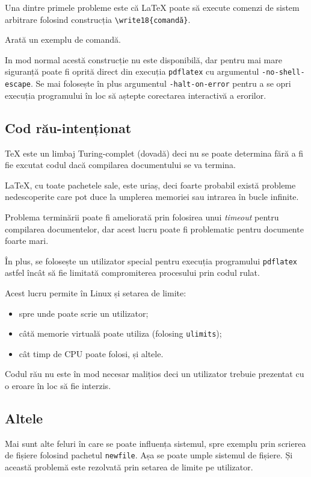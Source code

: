 \documentclass[a4wide,12pt]{report}
\newcommand{\eng}[1]{\emph{#1}} %
\newcommand{\cod}[1]{\texttt{#1}}
\newcommand{\idee}[1]{{\color{red} #1}}
\newcommand{\poate}[1]{#1}
\begin{document}
Una dintre primele probleme este că \LaTeX{} poate să execute comenzi de sistem
arbitrare folosind construcția \cod{\textbackslash write18\{comandă\}}.

\idee{Arată un exemplu de comandă.}

In mod normal acestă construcție nu este disponibilă, dar pentru mai mare
siguranță poate fi oprită direct din execuția \cod{pdflatex} cu argumentul
\cod{-no-shell-escape}. \poate{Se mai folosește în plus argumentul
\cod{-halt-on-error} pentru a se opri execuția programului în loc să aștepte
corectarea interactivă a erorilor.}

\subsection{Cod rău-intenționat}

\TeX{} este un limbaj Turing-complet \idee{(dovadă)} deci nu se poate determina
fără a fi fie excutat codul dacă compilarea documentului se va termina.

\LaTeX{}, cu toate pachetele sale, este uriaș, deci foarte probabil există
probleme nedescoperite care pot duce la umplerea memoriei sau intrarea în bucle
infinite.

Problema terminării poate fi ameliorată prin folosirea unui \eng{timeout} pentru
compilarea documentelor, dar acest lucru poate fi problematic pentru documente
foarte mari.

În plus, se folosește un utilizator special pentru execuția programului
\cod{pdflatex} astfel încât să fie limitată compromiterea procesului prin codul
rulat.

Acest lucru permite în Linux și setarea de limite:

\begin{itemize}
\item spre unde poate scrie un utilizator;
\item câtă memorie virtuală poate utiliza (folosing \cod{ulimits});
\item cât timp de CPU poate folosi, și altele.
\end{itemize}

Codul rău nu este în mod necesar malițios deci un utilizator trebuie prezentat
cu o eroare în loc să fie interzis.

\subsection{Altele}

Mai sunt alte feluri în care se poate influența sistemul, spre exemplu prin
scrierea de fișiere folosind pachetul \cod{newfile}. Așa se poate umple sistemul
de fișiere. Și această problemă este rezolvată prin setarea de limite pe
utilizator.
\end{document}
